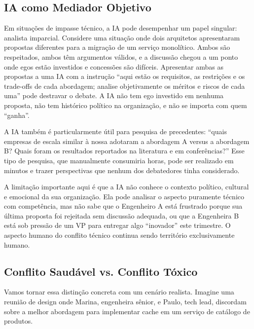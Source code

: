 \subsection{IA como Mediador Objetivo}

Em situações de impasse técnico, a IA pode desempenhar um papel singular:
analista imparcial. Considere uma situação onde dois arquitetos apresentaram
propostas diferentes para a migração de um serviço monolítico. Ambos são
respeitados, ambos têm argumentos válidos, e a discussão chegou a um ponto
onde egos estão investidos e concessões são difíceis. Apresentar ambas as
propostas a uma IA com a instrução ``aqui estão os requisitos, as
restrições e os trade-offs de cada abordagem; analise objetivamente os
méritos e riscos de cada uma'' pode destravar o debate. A IA não tem ego
investido em nenhuma proposta, não tem histórico político na organização, e
não se importa com quem ``ganha''.

A IA também é particularmente útil para pesquisa de precedentes: ``quais
empresas de escala similar à nossa adotaram a abordagem A versus a
abordagem B? Quais foram os resultados reportados na literatura e em
conferências?'' Esse tipo de pesquisa, que manualmente consumiria horas,
pode ser realizado em minutos e trazer perspectivas que nenhum dos debatedores
tinha considerado.

A limitação importante aqui é que a IA não conhece o
contexto político, cultural e emocional da sua organização. Ela pode analisar
o aspecto puramente técnico com competência, mas não sabe que o Engenheiro A
está frustrado porque sua última proposta foi rejeitada sem discussão
adequada, ou que a Engenheira B está sob pressão de um VP para entregar
algo ``inovador'' este trimestre. O aspecto humano do conflito técnico
continua sendo território exclusivamente humano.

\subsection{Conflito Saudável vs. Conflito Tóxico}

Vamos tornar essa distinção concreta com um cenário realista. Imagine uma
reunião de design onde Marina, engenheira sênior, e Paulo, tech lead,
discordam sobre a melhor abordagem para implementar cache em um serviço
de catálogo de produtos.

